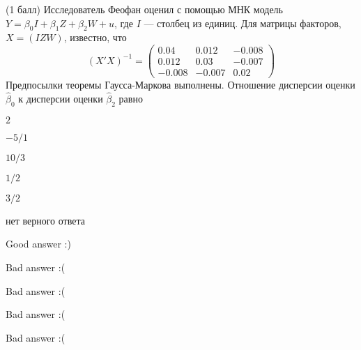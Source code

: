 
\begin{question}
(1 балл) Исследователь Феофан оценил с помощью МНК модель
\(Y = \beta_0 I + \beta_1 Z + \beta_2 W + u\), где \(I\) — столбец из
единиц. Для матрицы факторов, \(X = (I Z W)\), известно, что \[
(X'X)^{-1} = \begin{pmatrix}
0.04 & 0.012 & -0.008 \\
0.012 & 0.03 & -0.007 \\
-0.008 & -0.007 & 0.02
\end{pmatrix}
\] Предпосылки теоремы Гаусса-Маркова выполнены. Отношение дисперсии
оценки \(\hat \beta_0\) к дисперсии оценки \(\hat \beta_2\) равно
\begin{answerlist}
  \item \(2\)
  \item \(-5/1\)
  \item \(10/3\)
  \item \(1/2\)
  \item \(3/2\)
  \item нет верного ответа
\end{answerlist}
\end{question}

\begin{solution}
\begin{answerlist}
  \item Good answer :)
  \item Bad answer :(
  \item Bad answer :(
  \item Bad answer :(
  \item Bad answer :(
\end{answerlist}
\end{solution}
